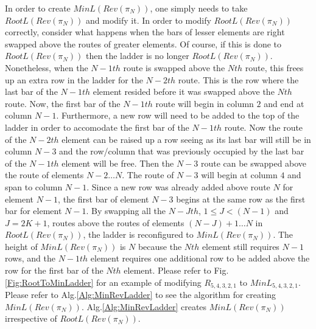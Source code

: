    In order to create $MinL(Rev(\pi_{N}))$, one simply needs to 
   take $RootL(Rev(\pi_{N}))$ and modify it. In order to modify $RootL(Rev(\pi_{N}))$ correctly, consider what happens when 
   the bars of lesser elements are right swapped above the routes of greater elements. Of course, if this is done to $RootL(Rev(\pi_{N}))$ then 
   the ladder is no longer $RootL(Rev(\pi_{N}))$. Nonetheless, when the $N-1th$ route is swapped above the $Nth$ route, 
   this frees up an extra row in the ladder for the $N-2th$ route. This is the row where the last bar of the $N-1th$ element resided
   before it was swapped above the $Nth$ route. Now, the first bar of the $N-1th$ route will begin in column $2$ and end at column $N-1$. 
   Furthermore, a new row will need to be added to the top of the ladder in order to accomodate the first bar of the $N-1th$ route. Now the route 
   of the $N-2th$ element can be raised up a row seeing as its last bar will still be in column $N-3$ and the row/column 
   that was previously occupied by the last bar of the $N-1th$ element will be free. Then the $N-3$ route can be swapped above 
   the route of elements $N-2 \dots N$. The route of $N-3$ will begin at column $4$ and span to column $N-1$. 
   Since a new row was already added above route $N$ for element $N-1$, 
   the first bar of element $N-3$ begins at the 
   same row as the first bar for element $N-1$. By  swapping 
   all the  $N-Jth$, $1 \leq J < (N-1)$ and $J=2K+1$, routes above the routes of elements 
   $(N-J)+1 \dots N$ in $RootL(Rev(\pi_{N}))$, the ladder is reconfigured to $MinL(Rev(\pi_{N}))$. The height of $MinL(Rev(\pi_{N}))$ is $N$ 
   because the $Nth$ element still requires $N-1$ rows, and the $N-1th$ element requires one additional row to be added above 
   the row for the first bar of the $Nth$ element. Please refer 
   to Fig.\ref{Fig:RootToMinLadder} for an example of modifying $R_{5,4,3,2,1}$ to $MinL_{5,4,3,2,1}$. 
   Please refer to Alg.\ref{Alg:MinRevLadder} to see the algorithm for creating $MinL(Rev(\pi_{N}))$. Alg.\ref{Alg:MinRevLadder} 
   creates $MinL(Rev(\pi_{N}))$ irrespective of $RootL(Rev(\pi_{N}))$.\pagebreak


